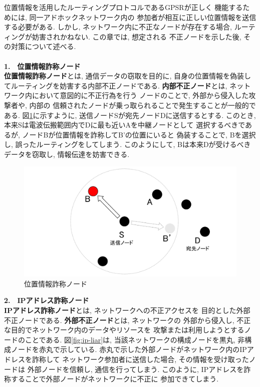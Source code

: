 位置情報を活用したルーティングプロトコルであるGPSRが正しく
機能するためには, 同一アドホックネットワーク内の
参加者が相互に正しい位置情報を送信する必要がある. 
しかし, ネットワーク内に不正なノードが存在する場合, 
ルーティングが妨害されかねない. この章では, 想定される 
不正ノードを示した後, その対策について述べる. \\

\\[0.5em]
\noindent \textbf{1.　位置情報詐称ノード}\\
\indent \textbf{位置情報詐称ノード}とは, 通信データの窃取を目的に, 
自身の位置情報を偽装してルーティングを妨害する内部不正ノードである. 
\textbf{内部不正ノード}とは, ネットワーク内において意図的に不正行為を行う
ノードのことで, 外部から侵入した攻撃者や, 内部の
信頼されたノードが乗っ取られることで発生することが一般的である. 
図\ref{fig:position-liar}に示すように, 送信ノードSが宛先ノードDに送信するとする. 
このとき, 本来Sは電波伝搬範囲内でDに最も近いAを中継ノードとして
選択するべきであるが, ノードBが位置情報を詐称してB'の位置にいると
偽装することで, Bを選択し, 誤ったルーティングをしてしまう. 
このようにして, Bは本来Dが受けるべきデータを窃取し, 
情報伝達を妨害できる.

\begin{figure}
  \centering
  \includegraphics[scale=0.6]{figures/position-liar.png}
  \caption{位置情報詐称ノード\cite{shinato}}
  \label{fig:position-liar}
\end{figure}

\noindent \textbf{2.　IPアドレス詐称ノード}\\
\indent \textbf{IPアドレス詐称ノード}とは, ネットワークへの不正アクセスを
目的とした外部不正ノードである. \textbf{外部不正ノード}とは, ネットワークの
外部から侵入し, 不正な目的でネットワーク内のデータやリソースを
攻撃または利用しようとするノードのことである. 図\ref{fig:ip-liar}は,  
当該ネットワークの構成ノードを黒丸, 非構成ノードを赤丸で示している. 
赤丸で示した外部ノードがネットワーク内のIPアドレスを詐称して
ネットワーク参加者に送信した場合, その情報を受け取ったノードは
外部ノードを信頼し, 通信を行ってしまう. このように, 
IPアドレスを詐称することで外部ノードがネットワークに不正に
参加できてしまう. 

